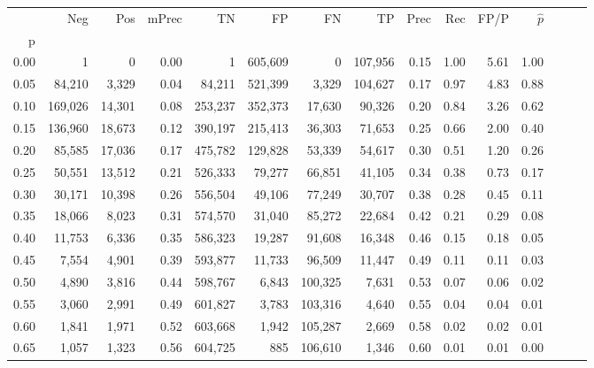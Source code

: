 \begin{tabular}{rrrrrrrrrrrrrrr}
\toprule
{} &      Neg &     Pos & mPrec &       TN &       FP &       FN &       TP &  Prec &   Rec &  FP/P & $\hat{p}$ \\
p    &          &         &       &          &          &          &          &       &       &       &           \\
\midrule
0.00 &        1 &       0 &  0.00 &        1 &  605,609 &        0 &  107,956 &  0.15 &  1.00 &  5.61 &      1.00 \\
0.05 &   84,210 &   3,329 &  0.04 &   84,211 &  521,399 &    3,329 &  104,627 &  0.17 &  0.97 &  4.83 &      0.88 \\
0.10 &  169,026 &  14,301 &  0.08 &  253,237 &  352,373 &   17,630 &   90,326 &  0.20 &  0.84 &  3.26 &      0.62 \\
0.15 &  136,960 &  18,673 &  0.12 &  390,197 &  215,413 &   36,303 &   71,653 &  0.25 &  0.66 &  2.00 &      0.40 \\
0.20 &   85,585 &  17,036 &  0.17 &  475,782 &  129,828 &   53,339 &   54,617 &  0.30 &  0.51 &  1.20 &      0.26 \\
0.25 &   50,551 &  13,512 &  0.21 &  526,333 &   79,277 &   66,851 &   41,105 &  0.34 &  0.38 &  0.73 &      0.17 \\
0.30 &   30,171 &  10,398 &  0.26 &  556,504 &   49,106 &   77,249 &   30,707 &  0.38 &  0.28 &  0.45 &      0.11 \\
0.35 &   18,066 &   8,023 &  0.31 &  574,570 &   31,040 &   85,272 &   22,684 &  0.42 &  0.21 &  0.29 &      0.08 \\
0.40 &   11,753 &   6,336 &  0.35 &  586,323 &   19,287 &   91,608 &   16,348 &  0.46 &  0.15 &  0.18 &      0.05 \\
0.45 &    7,554 &   4,901 &  0.39 &  593,877 &   11,733 &   96,509 &   11,447 &  0.49 &  0.11 &  0.11 &      0.03 \\
0.50 &    4,890 &   3,816 &  0.44 &  598,767 &    6,843 &  100,325 &    7,631 &  0.53 &  0.07 &  0.06 &      0.02 \\
0.55 &    3,060 &   2,991 &  0.49 &  601,827 &    3,783 &  103,316 &    4,640 &  0.55 &  0.04 &  0.04 &      0.01 \\
0.60 &    1,841 &   1,971 &  0.52 &  603,668 &    1,942 &  105,287 &    2,669 &  0.58 &  0.02 &  0.02 &      0.01 \\
0.65 &    1,057 &   1,323 &  0.56 &  604,725 &      885 &  106,610 &    1,346 &  0.60 &  0.01 &  0.01 &      0.00 \\

\end{tabular}
